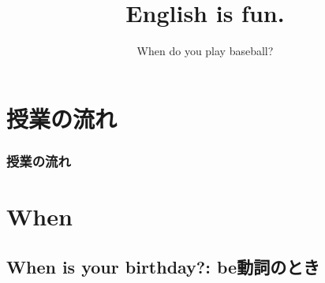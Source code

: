 \documentclass[aspectratio=169,xcolor={dvipsnames,table}]{beamer}
\title{English is fun.}
\subtitle{When do you play baseball?}
\author{}
\institute[]{}
\date[]
\begin{document}
\begin{frame}[plain]
  \titlepage
\end{frame}

\section*{授業の流れ}
\begin{frame}[plain]
  \frametitle{授業の流れ}
  \tableofcontents
\end{frame}

\section{When}
\subsection{When is your birthday?: be動詞のとき}
\end{document}
